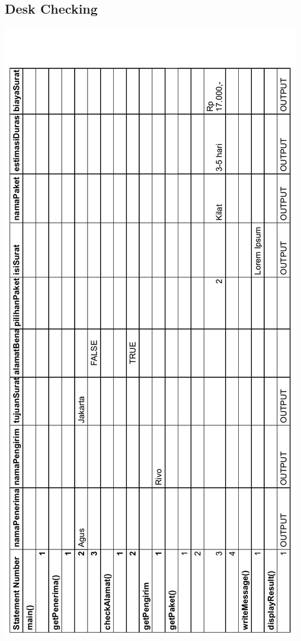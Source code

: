 \documentclass[
  12pt,
  answers  
]{exam}
\begin{document}
	\subsection*{Desk Checking}
	\includegraphics[clip]{pdf/Problem4DC.pdf}
\end{document}
